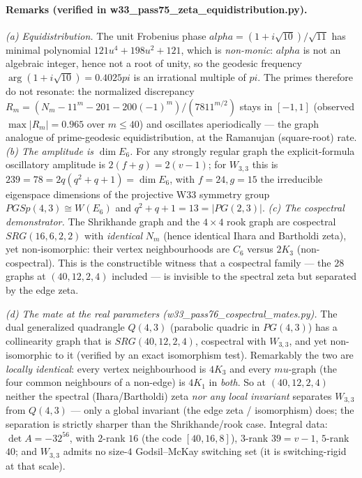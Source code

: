 \documentclass[12pt,a4paper]{article}
\def\mathrm#1{#1}%
\def\textbf#1{#1}%
\def\texttt#1{#1}%
\def\alpha{alpha}%
\def\mu{mu}%
\def\pi{pi}%
\def\cdot{ }%
\theoremstyle{definition}
\newcommand{\SRG}{\mathrm{SRG}}
\newcommand{\PG}{\mathrm{PG}}
\begin{document}
\paragraph{Remarks (verified in \texttt{w33\_pass75\_zeta\_equidistribution.py}).}
\emph{(a) Equidistribution.}  The unit Frobenius phase
$\alpha=(1+i\sqrt{10})/\sqrt{11}$ has minimal polynomial
$121u^4+198u^2+121$, which is \emph{non-monic}: $\alpha$ is not an
algebraic integer, hence not a root of unity, so the geodesic frequency
$\arg(1+i\sqrt{10})=0.4025\pi$ is an irrational multiple of $\pi$.  The
primes therefore do not resonate: the normalized discrepancy
$R_m=(N_m-11^m-201-200(-1)^m)/(78\cdot11^{m/2})$ stays in $[-1,1]$
(observed $\max|R_m|=0.965$ over $m\le40$) and oscillates aperiodically ---
the graph analogue of prime-geodesic equidistribution, at the Ramanujan
(square-root) rate.
\emph{(b) The amplitude is $\dim E_6$.}  For any strongly regular graph the
explicit-formula oscillatory amplitude is $2(f+g)=2(v-1)$; for $W_{3,3}$
this is $2\cdot39=78=2q(q^2+q+1)=\dim E_6$, with $f=24,g=15$ the
irreducible eigenspace dimensions of the projective W33 symmetry group
$\mathrm{PGSp}(4,3)\cong W(E_6)$ and $q^2+q+1=13=|\PG(2,3)|$.
\emph{(c) The cospectral demonstrator.}  The Shrikhande graph and the
$4\times4$ rook graph are cospectral $\SRG(16,6,2,2)$ with \emph{identical}
$N_m$ (hence identical Ihara and Bartholdi zeta), yet non-isomorphic: their
vertex neighbourhoods are $C_6$ versus $2K_3$ (non-cospectral).  This is the
constructible witness that a cospectral family --- the $28$ graphs at
$(40,12,2,4)$ included --- is invisible to the spectral zeta but separated
by the edge zeta.

\emph{(d) The mate at the real parameters
(\texttt{w33\_pass76\_cospectral\_mates.py}).}  The dual generalized
quadrangle $Q(4,3)$ (parabolic quadric in $\PG(4,3)$) has a collinearity
graph that is $\SRG(40,12,2,4)$, cospectral with $W_{3,3}$, and yet
\textbf{non-isomorphic} to it (verified by an exact isomorphism test).
Remarkably the two are \emph{locally identical}: every vertex neighbourhood
is $4K_3$ and every $\mu$-graph (the four common neighbours of a non-edge)
is $4K_1$ in \emph{both}.  So at $(40,12,2,4)$ neither the spectral
(Ihara/Bartholdi) zeta \emph{nor any local invariant} separates $W_{3,3}$
from $Q(4,3)$ --- only a global invariant (the edge zeta / isomorphism)
does; the separation is strictly sharper than the Shrikhande/rook case.
Integral data: $\det A=-3\cdot2^{56}$, with $2$-rank $16$ (the code
$[40,16,8]$), $3$-rank $39=v-1$, $5$-rank $40$; and $W_{3,3}$ admits no
size-$4$ Godsil--McKay switching set (it is switching-rigid at that scale).
\end{document}
